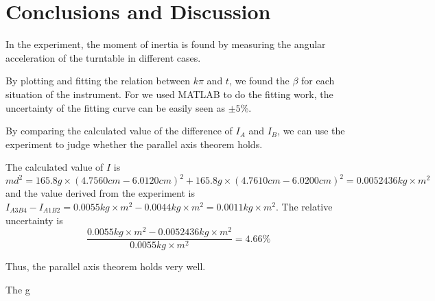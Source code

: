 \section{Conclusions and Discussion}

In the experiment, the moment of inertia is found by measuring the angular acceleration of the turntable in different cases. 

By plotting and fitting the relation between $k\pi$ and $ t $, we found the $\beta$ for each situation of the instrument.
For we used MATLAB to do the fitting work, the uncertainty of the fitting curve can be easily seen as $\pm 5\%$.

By comparing the calculated value of the difference of $I_A$ and $I_B$, we can use the experiment to judge whether the parallel axis theorem holds.

The calculated value of $I$ is $md^2 =  165.8 g \times  (4.7560 cm - 6.0120cm )^2 + 165.8 g \times  (4.7610 cm - 6.0200cm )^2  = 0.0052436 kg\times m^2 $ and the value derived from the experiment is $ I_{A3B4} -I_{A1B2} =0.0055  kg\times m^2 -   0.0044  kg\times m^2 = 0.0011 kg\times m^2 $.
The relative uncertainty is $$ \frac{ 0.0055  kg\times m^2 - 0.0052436 kg \times m^2}{0.0055  kg\times m^2} = 4.66 \% $$

Thus, the parallel axis theorem holds very well.

The g